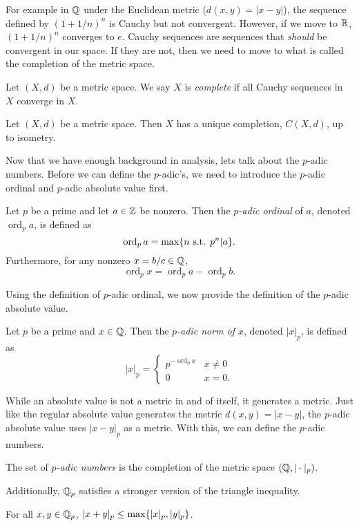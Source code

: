 \documentclass[notitlepage]{problem-solving}
\def\ord{\operatorname{ord}}
\begin{document}
For example in $\mathbb{Q}$ under the Euclidean metric ($d(x,y)=|x-y|$), the sequence defined by $(1+1/n)^n$ is Cauchy but not convergent.
However, if we move to $\mathbb{R}$, $(1+1/n)^n$ converges to $e$.
Cauchy sequences are sequences that \textit{should} be convergent in our space.
If they are not, then we need to move to what is called the completion of the metric space.
\begin{definition}
	Let $(X,d)$ be a metric space.
	We say $X$ is \textit{complete} if all Cauchy sequences in $X$ converge in $X$.
\end{definition}
\begin{thm}
	Let $(X,d)$ be a metric space.
	Then $X$ has a unique completion, $C(X,d)$, up to isometry.
\end{thm}

Now that we have enough background in analysis, lets talk about the $p$-adic numbers.
Before we can define the $p$-adic's, we need to introduce the $p$-adic ordinal and $p$-adic absolute value first.
\begin{definition}
	Let $p$ be a prime and let $a\in\mathbb{Z}$ be nonzero.
	Then the \textit{$p$-adic ordinal} of $a$, denoted $\ord_p a$, is defined as
	\[
		\ord_p a = \max\set{n\text{ s.t. } p^n | a}.
	\]
	Furthermore, for any nonzero $x=b/c\in\mathbb{Q}$,
	\[
		\ord_p x = \ord_p a - \ord_p b.
	\]
\end{definition}
Using the definition of $p$-adic ordinal, we now provide the definition of the $p$-adic absolute value.
\begin{definition}
	Let $p$ be a prime and $x\in\mathbb{Q}$.
	Then the \textit{$p$-adic norm of $x$}, denoted $|x|_p$, is defined as
	\[
		|x|_p =
		\begin{cases}
			p^{-\ord_p x} & x\neq 0\\
			0 & x=0.
		\end{cases}
	\]
\end{definition}
While an absolute value is not a metric in and of itself, it generates a metric.
Just like the regular absolute value generates the metric $d(x,y)=|x-y|$, the $p$-adic absolute value uses $|x-y|_p$ as a metric.
With this, we can define the $p$-adic numbers.
\begin{definition}
	The set of \textit{$p$-adic numbers} is the completion of the metric space $(\mathbb{Q},|\cdot|_p)$.
\end{definition}
Additionally, $\mathbb{Q}_p$ satisfies a stronger version of the triangle inequality.
\begin{thm}
	For all $x,y\in\mathbb{Q}_p$, $|x+y|_p\leq\max\lbrace |x|_p,|y|_p \rbrace$.
\end{thm}
\end{document}
